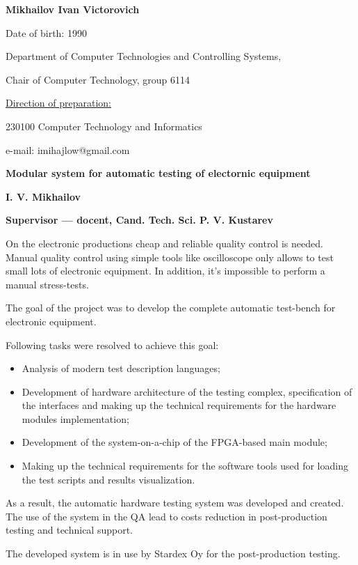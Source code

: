 \documentclass[a4paper,12pt,twoside]{article}
\begin{document}
\pagestyle{empty}
\marginsize{1.5in}{1in}{1in}{1in}
\linespread{1.5}
\begin{flushright}
\textbf{Mikhailov Ivan Victorovich}

Date of birth: 1990

Department of Computer Technologies and Controlling Systems,

Chair of Computer Technology, group 6114

\underline{Direction of preparation:}

230100 Computer Technology and Informatics

e-mail: imihajlow@gmail.com
\end{flushright}

\begin{center}
\textbf{Modular system for automatic testing of electornic equipment}

\textbf{I. V. Mikhailov}

\textbf{Supervisor --- docent, Cand. Tech. Sci. P. V. Kustarev}
\end{center}

On the electronic productions cheap and reliable quality control is needed.
Manual quality control using simple tools like oscilloscope only allows to test small lots of electronic equipment. In addition, it's impossible to perform a manual stress-tests.

The goal of the project was to develop the complete automatic test-bench for electronic equipment.

Following tasks were resolved to achieve this goal:
\begin{itemize}
\item Analysis of modern test description languages;
\item Development of hardware architecture of the testing complex, specification of the interfaces and making up the technical requirements for the hardware modules implementation;
\item Development of the system-on-a-chip of the FPGA-based main module;
\item Making up the technical requirements for the software tools used for loading the test scripts and results visualization.
\end{itemize}

As a result, the automatic hardware testing system was developed and created. The use of the system in the QA lead to costs reduction in post-production testing and technical support.

The developed system is in use by Stardex Oy for the post-production testing.
\end{document}
